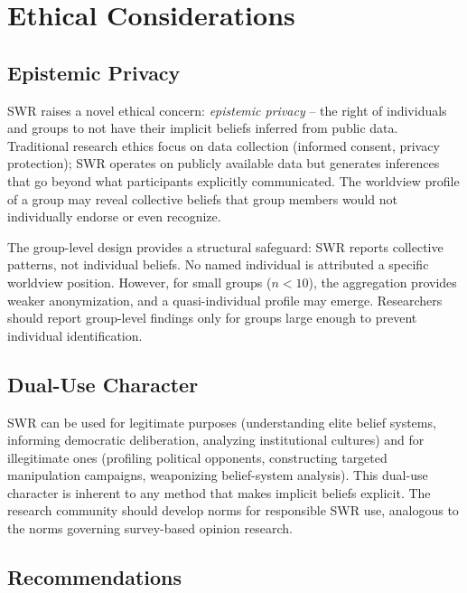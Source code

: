 \documentclass[11pt,a4paper]{article}
\begin{document}
\section{Ethical Considerations}
\label{sec:ethics}

\subsection{Epistemic Privacy}

SWR raises a novel ethical concern: \emph{epistemic privacy} -- the right of individuals and groups to not have their implicit beliefs inferred from public data. Traditional research ethics focus on data collection (informed consent, privacy protection); SWR operates on publicly available data but generates inferences that go beyond what participants explicitly communicated. The worldview profile of a group may reveal collective beliefs that group members would not individually endorse or even recognize.

The group-level design provides a structural safeguard: SWR reports collective patterns, not individual beliefs. No named individual is attributed a specific worldview position. However, for small groups ($n < 10$), the aggregation provides weaker anonymization, and a quasi-individual profile may emerge. Researchers should report group-level findings only for groups large enough to prevent individual identification.

\subsection{Dual-Use Character}

SWR can be used for legitimate purposes (understanding elite belief systems, informing democratic deliberation, analyzing institutional cultures) and for illegitimate ones (profiling political opponents, constructing targeted manipulation campaigns, weaponizing belief-system analysis). This dual-use character is inherent to any method that makes implicit beliefs explicit. The research community should develop norms for responsible SWR use, analogous to the norms governing survey-based opinion research.

\subsection{Recommendations}
\end{document}
